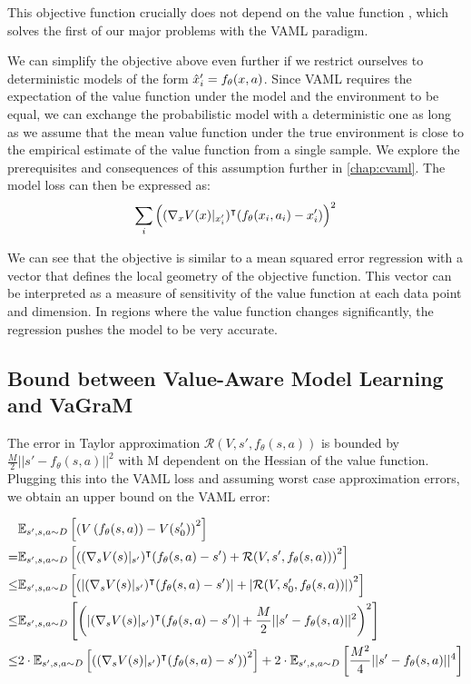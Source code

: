 This objective function crucially does not depend on the value function , which solves the first of our major problems with the VAML paradigm.

We can simplify the objective above even further if we restrict ourselves to deterministic models of the form $\hat{x}'_i = f_\theta(x,a)$.
Since VAML requires the expectation of the value function under the model and the environment to be equal, we can exchange the probabilistic model with a deterministic one as long as we assume that the mean value function under the true environment is close to the empirical estimate of the value function from a single sample.
We explore the prerequisites and consequences of this assumption further in \autoref{chap:cvaml}.
The model loss can then be expressed as:
\begin{align}
    \sum_i {\left((\nabla_x V(x)|_{x'_i})^\intercal (f_\theta(x_i,a_i) - x'_i) \right)^2} \label{eq:vagram:taylor_vaml}
\end{align}

We can see that the objective is similar to a mean squared error regression with a vector that defines the local geometry of the objective function. This vector can be interpreted as a measure of sensitivity of the value function at each data point and dimension. In regions where the value function changes significantly, the regression pushes the model to be very accurate. 

\subsection{Bound between Value-Aware Model Learning and VaGraM}
\label{app:taylor_bound}

The error in Taylor approximation $\mathcal{R}(V, s', f_\theta(s,a))$ is bounded by $\frac{M}{2}||s' - f_\theta(s,a)||^2$ with M dependent on the Hessian of the value function. Plugging this into the VAML loss and assuming worst case approximation errors, we obtain an upper bound on the VAML error:

\begin{align*}
    &\mathbb{E}_{s',s,a \sim D}\left[\left(V\left(f_\theta(s,a) \right) - V(s_0')\right)^2\right] \\
    = &\mathbb{E}_{s',s,a \sim D}\left[\left((\nabla_s V(s)|_{s'})^\intercal (f_\theta(s,a) - s') + \mathcal{R}(V, s',f_\theta(s,a))\right)^2\right]\\
    \leq &\mathbb{E}_{s',s,a \sim D}\left[\left(\left|(\nabla_s V(s)|_{s'})^\intercal (f_\theta(s,a) - s')\right| + \left|\mathcal{R}(V, s_0', f_\theta(s,a))\right|\right)^2\right]\\
    \leq &\mathbb{E}_{s',s,a \sim D}\left[{\left(\left|(\nabla_s V(s)|_{s'})^\intercal (f_\theta(s,a) - s')\right| + \frac{M}{2}||s' - f_\theta(s,a)||^2\right)^2}\right]\\
    \leq &2\cdot\mathbb{E}_{s',s,a \sim D}\left[{\left((\nabla_s V(s)|_{s'})^\intercal (f_\theta(s,a) - s')\right)^2}\right] + 2\cdot\mathbb{E}_{s',s,a \sim D}\left[\frac{M^2}{4}||s' - f_\theta(s,a)||^4\right]
\end{align*}

